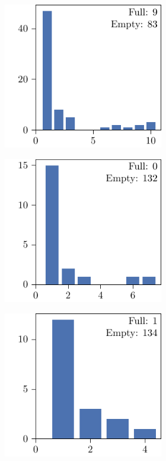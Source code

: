 \begin{figure}[p]
  \centering
  \begin{subfigure}{\textwidth}
    \centering
    \begin{subfigure}{\mymultiouter}
        \includegraphics[width=\mymultiinner]{figures/new/abs_common-rain_sydney-qlibra-permutation}
    \end{subfigure}
    \begin{subfigure}{\mymultiouter}
        \includegraphics[width=\mymultiinner]{figures/new/abs_common-rain_sydney-qlibra-retraining}
    \end{subfigure}
    \begin{subfigure}{\mymultiouter}
        \includegraphics[width=\mymultiinner]{figures/new/abs_common-rain_sydney-permutation-retraining}

\end{subfigure}
\end{subfigure}
\end{figure}
